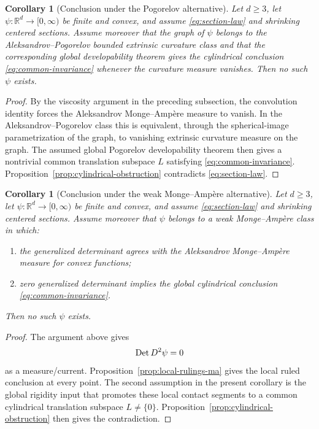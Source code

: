 \documentclass[11pt]{amsart}
\def\R{\mathbb{R}}
\newtheorem{corollary}[theorem]{Corollary}
\begin{document}
\begin{corollary}[Conclusion under the Pogorelov alternative]
\label{cor:pogorelov-alternative}
Let $d\geq3$, let $\psi:\R^d\to[0,\infty)$ be finite and convex, and assume
\eqref{eq:section-law} and shrinking centered sections.  Assume moreover that
the graph of $\psi$ belongs to the Aleksandrov--Pogorelov bounded extrinsic
curvature class and that the corresponding global developability theorem gives
the cylindrical conclusion \eqref{eq:common-invariance} whenever the curvature
measure vanishes.  Then no such $\psi$ exists.
\end{corollary}

\begin{proof}
By the viscosity argument in the preceding subsection, the convolution identity
forces the Aleksandrov Monge--Ampère measure to vanish.  In the
Aleksandrov--Pogorelov class this is equivalent, through the spherical-image
parametrization of the graph, to vanishing extrinsic curvature measure on the
graph.  The assumed global Pogorelov developability theorem then gives a
nontrivial common translation subspace $L$ satisfying
\eqref{eq:common-invariance}.  Proposition~\ref{prop:cylindrical-obstruction}
contradicts \eqref{eq:section-law}.
\end{proof}

\begin{corollary}[Conclusion under the weak Monge--Ampère alternative]
\label{cor:ma-alternative}
Let $d\geq3$, let $\psi:\R^d\to[0,\infty)$ be finite and convex, and assume
\eqref{eq:section-law} and shrinking centered sections.  Assume moreover that
$\psi$ belongs to a weak Monge--Ampère class in which:
\begin{enumerate}
    \item the generalized determinant agrees with the Aleksandrov
    Monge--Ampère measure for convex functions;
    \item zero generalized determinant implies the global cylindrical
    conclusion \eqref{eq:common-invariance}.
\end{enumerate}
Then no such $\psi$ exists.
\end{corollary}

\begin{proof}
The argument above gives
\[
    {\rm Det}\,D^2\psi=0
\]
as a measure/current.  Proposition~\ref{prop:local-rulings-ma} gives the local
ruled conclusion at every point.  The second assumption in the present
corollary is the global rigidity input that promotes these local contact
segments to a common cylindrical translation subspace $L\neq\{0\}$.
Proposition~\ref{prop:cylindrical-obstruction} then gives the contradiction.
\end{proof}
\end{document}

